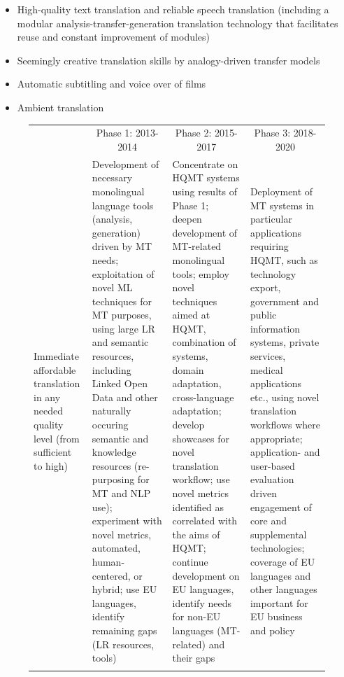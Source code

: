 \documentclass[10pt, plain]{../../metanetpaper}
\begin{document}
\begin{multicols}{2}
\begin{itemize}
\item High-quality text translation and reliable speech translation (including a modular analysis-transfer-generation translation technology that facilitates reuse and constant improvement of modules)
\item Seemingly creative translation skills by analogy-driven transfer models
\item Automatic subtitling and voice over of films
\item Ambient translation
\end{itemize}

\begin{figure}[htbp]
  \centering
  \small
  \begin{tabular}{@{}p{2.5cm}p{4cm}p{4cm}p{4cm}@{}} \toprule\addlinespace
    \multicolumn{1}{c}{Research Priority} & \multicolumn{1}{c}{Phase 1: 2013-2014} & \multicolumn{1}{c}{Phase 2: 2015-2017} & \multicolumn{1}{c}{Phase 3: 2018-2020} \\ \addlinespace\midrule\addlinespace
    Immediate affordable translation in any needed quality level (from sufficient to high) & Development of necessary monolingual language tools (analysis, generation) driven by MT needs; exploitation of novel ML techniques for MT purposes, using large LR and semantic resources, including Linked Open Data and other naturally occuring semantic and knowledge  resources (re-purposing for MT and NLP use); experiment with novel metrics, automated, human-centered, or hybrid; use EU languages, identify remaining gaps (LR resources, tools) & Concentrate on HQMT systems using results of Phase 1; deepen development of MT-related monolingual tools; employ novel techniques aimed at HQMT, combination of systems, domain adaptation, cross-language adaptation; develop showcases for novel translation workflow; use novel metrics identified as correlated with the aims of HQMT; continue development on EU languages, identify needs for non-EU languages (MT-related) and their gaps & Deployment of MT systems in particular applications requiring HQMT, such as technology export, government and public information systems, private services, medical applications etc., using novel translation workflows where appropriate; application- and user-based evaluation driven engagement of core and supplemental technologies; coverage of EU languages and other languages important for EU business and policy \\ \addlinespace

\end{tabular}
\end{figure}
\end{multicols}
\end{document}
